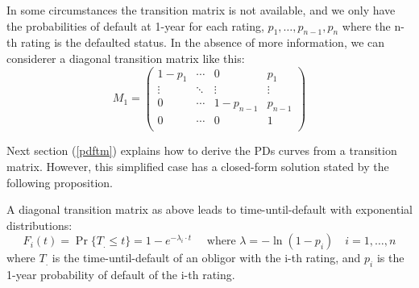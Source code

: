 \documentclass[11pt,fleqn]{book} %
\begin{document}
In some circumstances the transition matrix is not available, and we only 
have the probabilities of default at 1-year for each rating, 
$p_1,\dots,p_{n-1},p_n$ where the n-th rating is the defaulted status. 
In the absence of more information, we can considerer a diagonal transition 
matrix like this:
\begin{displaymath}
	M_1 = \left(
	\begin{array}{cccc}
		1-p_1  & \cdots & 0         & p_1     \\
		\vdots & \ddots & \vdots    & \vdots  \\
		0      & \cdots & 1-p_{n-1} & p_{n-1} \\
		0      & \cdots & 0         & 1       \\
	\end{array}
	\right)
\end{displaymath}

Next section (\ref{pdftm}) explains how to derive the PDs curves from a 
transition matrix. However, this simplified case has a closed-form solution 
stated by the following proposition.

\begin{proposition}
	\label{prop:pdfsv}
	A diagonal transition matrix as above leads to time-until-default with 
	exponential distributions:
	\begin{displaymath}
		F_i(t) = \Pr\{T_. \le t\} = 1 - e^{-\lambda_i \cdot t} 
		\quad \text{ where } \lambda = -\ln(1-p_i)
		\quad i=1,\dots,n
	\end{displaymath}
	where $T_.$ is the time-until-default of an obligor with the i-th rating,
	and $p_i$ is the 1-year probability of default of the i-th rating. 
\end{proposition}
\end{document}
